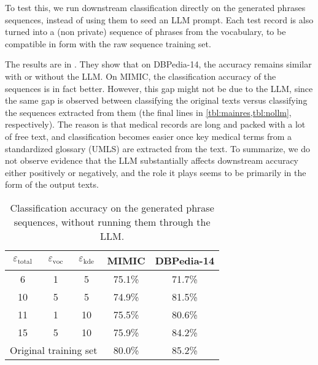 To test this, we run downstream classification directly on the generated phrases sequences, instead of using them to seed an LLM prompt. Each test record is also turned into a (non private) sequence of phrases from the vocabulary, to be compatible in form with the raw sequence training set. 

The results are in . They show that on DBPedia-14, the accuracy remains similar with or without the LLM. On MIMIC, the classification accuracy of the sequences is in fact better. However, this gap might not be due to the LLM, since the same gap is observed between classifying the original texts versus classifying the sequences extracted from them (the final lines in \cref{tbl:mainres,tbl:nollm},
respectively). 
The reason is that medical records are long and packed with a lot of free text, and classification becomes easier once key medical terms from a standardized glossary (UMLS) are extracted from the text. To summarize, we do not observe evidence that the LLM substantially affects downstream accuracy either positively or negatively, and the role it plays seems to be primarily in the form of the output texts.


\begin{table*}
\caption{Classification accuracy on the generated phrase sequences, without running them through the LLM.} \label{tbl:nollm}
\centering\begin{tabular}{c c c c c}
\toprule
$\varepsilon_{\mathrm{total}}$ & $\varepsilon_{\mathrm{voc}}$ & $\varepsilon_{\mathrm{kde}}$ & MIMIC & DBPedia-14 \\
\midrule
\rule{0pt}{3ex}
6 & 1 & 5 & 75.1\% & 71.7\% \\
10 & 5 & 5 & 74.9\% & 81.5\% \\
11 & 1 & 10 & 75.5\% & 80.6\% \\
15 & 5 & 10 & 75.9\% & 84.2\% \\
\midrule
\multicolumn{3}{c}{Original training set} & 80.0\% & 85.2\% \\
\bottomrule
\end{tabular}
\end{table*}

